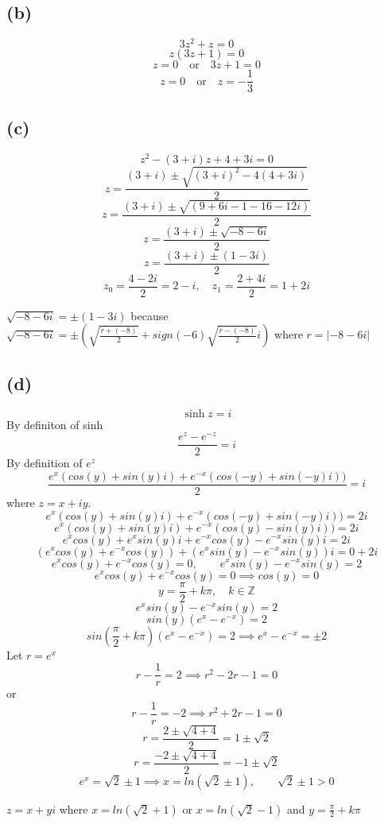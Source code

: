 \documentclass{article}
\begin{document}
\subsection*{(b)}
\[
   3z^2 + z = 0
\]
\[
   z(3z + 1) = 0
\]
\[
   z = 0 \quad \text{or} \quad 3z + 1 = 0
\]
\[
   z = 0 \quad \text{or} \quad z = -\frac{1}{3}
\]

\subsection*{(c)}
\[
   z^2 - (3 + i)z + 4 + 3i = 0
\]
\[
   z = \frac{(3 + i) \pm \sqrt{(3 + i)^2 - 4(4 + 3i)}}{2}
\]
\[
   z = \frac{(3 + i) \pm \sqrt{(9 + 6i - 1 - 16 - 12i)}}{2}
\]
\[
   z = \frac{(3 + i) \pm \sqrt{-8 - 6i}}{2}
\]
\[
   z = \frac{(3 + i) \pm (1 - 3i)}{2}
\]
\[
   z_0 = \frac{4 - 2i}{2} = 2 - i, \quad z_1 = \frac{2 + 4i}{2} = 1 + 2i
\]

\(\sqrt{-8 - 6i} = \pm (1 - 3i)\) because \(\sqrt{-8 - 6i} = \pm (\sqrt{\frac{r+(-8)}{2}} + sign(-6)\sqrt{\frac{r-(-8)}{2}}i)\) where \(r = |-8 -6i|\)

\subsection*{(d)}

\[
   \sinh z = i
\]
By definiton of sinh
\[
   \frac{e^z - e^{-z}}{2} = i
\]
By definition of \(e^z\)
\[
   \frac{e^x(cos(y) + sin(y)i) + e^{-x}(cos(-y) + sin(-y)i))}{2} = i
\]
where \(z = x + iy\).
\[
   e^x(cos(y) + sin(y)i) + e^{-x}(cos(-y) + sin(-y)i)) = 2i
\]
\[
   e^x(cos(y) + sin(y)i) + e^{-x}(cos(y) - sin(y)i)) = 2i
\]
\[
   e^x cos(y) + e^x sin(y)i + e^{-x} cos(y) - e^{-x} sin(y) i = 2i
\]
\[
   (e^x cos(y) + e^{-x} cos(y)) + (e^x sin(y) - e^{-x} sin(y)) i = 0 + 2i
\]
\[
   e^x cos(y) + e^{-x} cos(y) = 0, \qquad e^x sin(y) - e^{-x} sin(y) = 2
\]
\[
   e^x cos(y) + e^{-x} cos(y) = 0 \implies cos(y) = 0
\]
\[
   y = \frac{\pi}{2} + k\pi, \quad k \in \mathbb{Z}
\]
\[
   e^x sin(y) - e^{-x} sin(y) = 2
\]
\[
   sin(y)(e^x - e^{-x}) = 2
\]
\[
   sin(\frac{\pi}{2} + k \pi)(e^x - e^{-x}) = 2 \implies e^x - e^{-x} = \pm 2
\]
Let \(r = e^x\)
\[
   r - \frac{1}{r} = 2 \implies r^2 - 2r - 1 = 0
\]
or
\[
   r - \frac{1}{r} = -2 \implies r^2 + 2r - 1 = 0
\]
\[
   r = \frac{2 \pm \sqrt{4 + 4}}{2} = 1 \pm \sqrt{2}
\]
\[
   r = \frac{-2 \pm \sqrt{4 + 4}}{2} = -1 \pm \sqrt{2}
\]
\[
   e^x = \sqrt{2} \pm 1 \implies x = ln(\sqrt{2} \pm 1), \qquad \sqrt{2} \pm 1 > 0
\]

\(z = x+yi\) where \(x = ln(\sqrt{2} + 1)\) or \(x = ln(\sqrt{2} - 1)\) and \(y = \frac{\pi}{2} + k\pi\)
\end{document}
